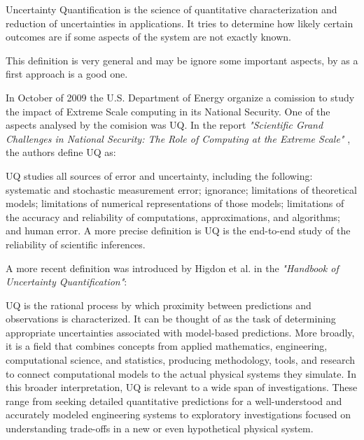 \begin{defn}
Uncertainty Quantification is the science of quantitative characterization and reduction of uncertainties in applications. It tries to determine how likely certain outcomes are if some aspects of the system are not exactly known.
\end{defn}

This definition is very general and may be ignore some important aspects, by as a first approach is a good one. 

In October of 2009 the U.S. Department of Energy organize a comission to study the impact of Extreme Scale computing in its National Security. One of the aspects analysed by the comision was UQ. In the report \textit{"Scientific Grand Challenges in National Security: The Role of Computing at the Extreme Scale"} \cite{DEnergy2009}, the authors define UQ as:

\begin{defn}
UQ studies all sources of error and uncertainty, including the following: systematic and stochastic measurement error; ignorance; limitations of theoretical models; limitations of numerical representations of those models; limitations of the accuracy and reliability of computations, approximations, and algorithms; and human error. A more precise definition is UQ is the end-to-end  study of the reliability of scientific inferences. \cite{DEnergy2009}
\end{defn}

A more recent definition was introduced by Higdon et al. \cite{Higdon2017} in the \textit{"Handbook of Uncertainty Quantification"}:

\begin{defn}
UQ is the rational process by which proximity between predictions and observations is characterized. It can be thought of as the task of determining appropriate uncertainties associated with model-based predictions. More broadly, it is a field that combines concepts from applied mathematics, engineering, computational science, and statistics, producing methodology, tools, and research to connect computational models to the actual physical systems they simulate. In this broader interpretation, UQ is relevant to a wide span of investigations. These range from seeking detailed quantitative predictions for a well-understood and accurately modeled engineering systems to exploratory investigations focused on understanding trade-offs in a new or even hypothetical physical system. \cite{Higdon2017}
\end{defn}

